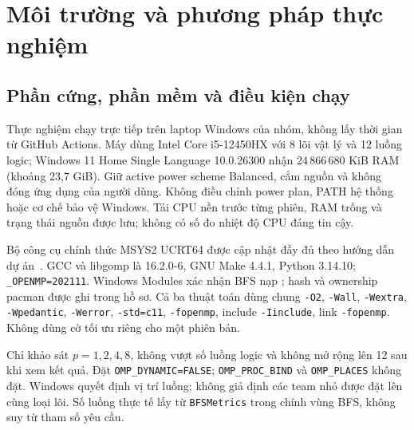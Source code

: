 \chapter{Môi trường và phương pháp thực nghiệm}
\section{Phần cứng, phần mềm và điều kiện chạy}
Thực nghiệm chạy trực tiếp trên laptop Windows của nhóm, không lấy thời gian từ GitHub Actions. Máy dùng Intel Core i5-12450HX với 8 lõi vật lý và 12 luồng logic; Windows 11 Home Single Language 10.0.26300 nhận 24\,866\,680 KiB RAM (khoảng 23,7 GiB). Giữ active power scheme Balanced, cắm nguồn và không đóng ứng dụng của người dùng. Không điều chỉnh power plan, PATH hệ thống hoặc cơ chế bảo vệ Windows. Tải CPU nền trước từng phiên, RAM trống và trạng thái nguồn được lưu; không có số đo nhiệt độ CPU đáng tin cậy.

Bộ công cụ chính thức MSYS2 UCRT64 được cập nhật đầy đủ theo hướng dẫn dự án~\cite{msys2update}. GCC và libgomp là 16.2.0-6, GNU Make 4.4.1, Python 3.14.10; \texttt{\_OPENMP=202111}. Windows Modules xác nhận BFS nạp ; hash và ownership pacman được ghi trong hồ sơ. Cả ba thuật toán dùng chung \texttt{-O2}, \texttt{-Wall}, \texttt{-Wextra}, \texttt{-Wpedantic}, \texttt{-Werror}, \texttt{-std=c11}, \texttt{-fopenmp}, include \texttt{-Iinclude}, link \texttt{-fopenmp}. Không dùng cờ tối ưu riêng cho một phiên bản.

Chỉ khảo sát $p=1,2,4,8$, không vượt số luồng logic và không mở rộng lên 12 sau khi xem kết quả. Đặt \texttt{OMP\_DYNAMIC=FALSE}; \texttt{OMP\_PROC\_BIND} và \texttt{OMP\_PLACES} không đặt. Windows quyết định vị trí luồng; không giả định các team nhỏ được đặt lên cùng loại lõi. Số luồng thực tế lấy từ \texttt{BFSMetrics} trong chính vùng BFS, không suy từ tham số yêu cầu.

